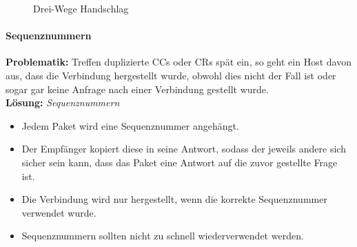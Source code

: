 \documentclass[a4paper, 11pt, accentcolor = tud3b]{tudreport}
\providecommand{\tikzTimeDiagram}[3][1]{\foreach \x in { 1, ..., #2 } { \draw [->] (\x*5*#1, 0) to (\x*5*#1, -#3-1); }}
\begin{document}
	            
	            \begin{figure}[H]
	            	\centering
	            	\caption{Drei-Wege Handschlag}
	            \end{figure}
	            
	            \paragraph{Sequenznummern}
		            \textbf{Problematik:} Treffen duplizierte CCs oder CRs spät ein, so geht ein Host davon aus, dass die Verbindung hergestellt wurde, obwohl dies nicht der Fall ist oder sogar gar keine Anfrage nach einer Verbindung gestellt wurde. \\
		            \textbf{Lösung:} \textit{Sequenznummern}
		            
		            \begin{itemize}
		            	\item Jedem Paket wird eine Sequenznummer angehängt.
		            	\item Der Empfänger kopiert diese in seine Antwort, sodass der jeweils andere sich sicher sein kann, dass das Paket eine Antwort auf die zuvor gestellte Frage ist.
		            	\item Die Verbindung wird nur hergestellt, wenn die korrekte Sequenznummer verwendet wurde.
		            	\item Sequenznummern sollten nicht zu schnell wiederverwendet werden.
		            \end{itemize}
\end{document}
